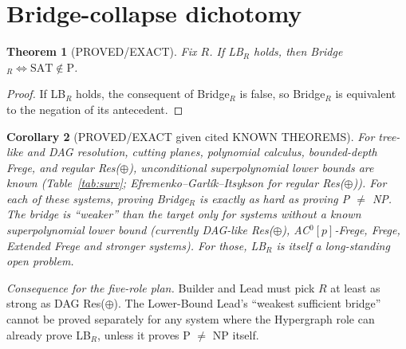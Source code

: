 \documentclass[11pt]{article}
\newtheorem{theorem}{Theorem}
\newtheorem{corollary}[theorem]{Corollary}
\newcommand{\SAT}{\mathrm{SAT}}
\begin{document}
\section{Bridge-collapse dichotomy}
\begin{theorem}[PROVED/EXACT]\label{thm:collapse}
Fix $R$. If LB$_R$ holds, then Bridge$_R \iff \SAT\notin\mathrm P$.
\end{theorem}
\begin{proof}
If LB$_R$ holds, the consequent of Bridge$_R$ is false, so Bridge$_R$ is
equivalent to the negation of its antecedent.
\end{proof}
\begin{corollary}[PROVED/EXACT given cited KNOWN THEOREMS]
For tree-like and DAG resolution, cutting planes, polynomial calculus,
bounded-depth Frege, and regular Res($\oplus$), unconditional
superpolynomial lower bounds are known (Table~\ref{tab:surv}; Efremenko--Garl\'ik--Itsykson
for regular Res($\oplus$)). For each of these systems, proving Bridge$_R$ is
\emph{exactly} as hard as proving P $\ne$ NP. The bridge is ``weaker''
than the target only for systems without a known superpolynomial lower bound
(currently DAG-like Res($\oplus$), AC$^0[p]$-Frege, Frege, Extended Frege
and stronger systems). For those, LB$_R$ is itself a long-standing open
problem.
\end{corollary}
\emph{Consequence for the five-role plan.} Builder and Lead must pick $R$
at least as strong as DAG Res($\oplus$). The Lower-Bound Lead's ``weakest
sufficient bridge'' cannot be proved separately for any system where the
Hypergraph role can already prove LB$_R$, unless it proves P $\ne$ NP
itself.
\end{document}
